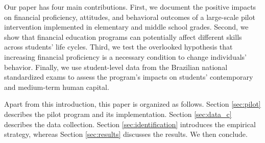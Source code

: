 Our paper has four main contributions. First, we document the positive impacts on financial proficiency, attitudes, and behavioral outcomes of a large-scale pilot intervention implemented in elementary and middle school grades.  Second, we show that financial education programs can potentially affect different skills across students' life cycles. Third, we test the overlooked hypothesis that increasing financial proficiency is a necessary condition to change individuals' behavior. Finally, we use student-level data from the Brazilian national standardized exams to assess the program's impacts on students' contemporary and medium-term human capital.

Apart from this introduction, this paper is organized as follows. Section \ref{sec:pilot} describes the pilot program and its implementation. Section \ref{sec:data_c} describes the data collection. Section \ref{sec:identification} introduces the empirical strategy, whereas Section \ref{sec:results} discusses the results. We then conclude.

